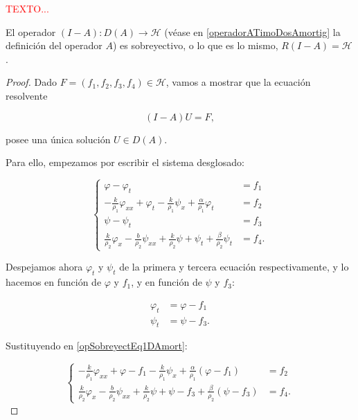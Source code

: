 \textcolor{red}{TEXTO...}

\begin{Proposicion}
\label{ch:TimoshenkoFric:prop:ResolventeEsSobreyect}
    El operador $(I-A) : D(A) \rightarrow \mathcal{H}$ (véase en \eqref{operadorATimoDosAmortig} la definición del operador $A$) es sobreyectivo, o lo que es lo mismo, $R(I-A) = \mathcal{H}$.
\end{Proposicion}

\begin{proof}
    Dado $F = (f_1, f_2, f_3, f_4) \in \mathcal{H}$, vamos a mostrar que la ecuación resolvente

    \[(I-A)U = F,\]

    posee una única solución $U \in D(A)$.  

    Para ello, empezamos por escribir el sistema desglosado:

    \begin{equation}
        \label{opSobreyectEq1DAmort}
        \begin{cases}
            \varphi - \varphi_t &= f_1\\
            -\frac{k}{\rho_1}\varphi_{xx} + \varphi_t - \frac{k}{\rho_1}\psi_x + \frac{\alpha}{\rho_1}\varphi_t &= f_2\\
            \psi - \psi_t &= f_3\\
            \frac{k}{\rho_2}\varphi_x - \frac{b}{\rho_2}\psi_{xx} + \frac{k}{\rho_2}\psi + \psi_t + \frac{\beta}{\rho_2}\psi_t &= f_4.
        \end{cases}
    \end{equation}

    Despejamos ahora $\varphi_t$ y $\psi_t$ de la primera y tercera ecuación respectivamente, y lo hacemos en función de $\varphi$ y $f_1$, y en función de $\psi$ y $f_3$:

    \begin{align*}
        \varphi_t &= \varphi - f_1\\
        \psi_t &= \psi - f_3.
    \end{align*}

    Sustituyendo en \eqref{opSobreyectEq1DAmort}:

    \begin{equation*}
        \begin{cases}
            -\frac{k}{\rho_1}\varphi_{xx} + \varphi - f_1 - \frac{k}{\rho_1}\psi_x + \frac{\alpha}{\rho_1}(\varphi - f_1) &= f_2\\
            \frac{k}{\rho_2}\varphi_x - \frac{b}{\rho_2}\psi_{xx} + \frac{k}{\rho_2}\psi + \psi - f_3 + \frac{\beta}{\rho_2}(\psi - f_3) &= f_4.
        \end{cases}
    \end{equation*}


\end{proof}
